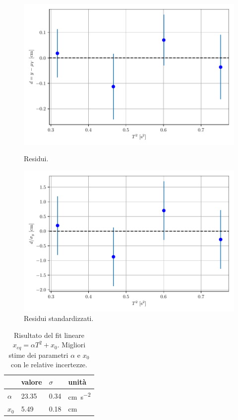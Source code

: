 \documentclass[titlepage]{article}
\numberwithin{equation}{section}
\numberwithin{figure}{section}
\numberwithin{table}{section}
\begin{document}
\begin{figure}[ht]
  \centering
  \begin{minipage}{0.5 \textwidth}
    \includegraphics[width=\textwidth]{Images/Residui.pdf}
    \caption{Residui.}
  \end{minipage}%
  \begin{minipage}{0.5 \textwidth}
    \includegraphics[width=\textwidth]{Images/ResiduiS.pdf}
    \caption{Residui standardizzati.}
  \end{minipage}
\end{figure}

\begin{table}[ht]
  \centering
  \begin{tabular}{llll}
    \toprule
    & valore & $\sigma$ & unità \\
    \midrule
    $\alpha$ & 23.35 & 0.34 & \si{\centi\metre\per\second\squared} \\
    $x_0$    & 5.49  & 0.18 & \si{\centi\metre} \\
    \bottomrule
  \end{tabular}
  \caption{Risultato del fit lineare $x_{eq} = \alpha T^2 + x_0$. Migliori stime dei parametri $\alpha$ e $x_0$ con le relative incertezze.}
\end{table}
\end{document}
